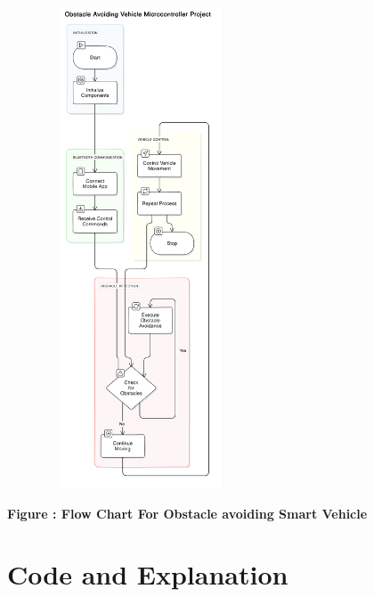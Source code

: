 \documentclass[12pt,a4paper]{report}
\begin{document}
\begin{center}
    {\includegraphics[width=300px, height=540px]{FD.png}} 
\end{center}
\begin{center}
    \parbox{0.8\textwidth}{ 
        \centering
        \textbf{Figure : Flow Chart For Obstacle avoiding Smart Vehicle}
    }
\end{center}

\chapter*{Code and Explanation}
\end{document}
